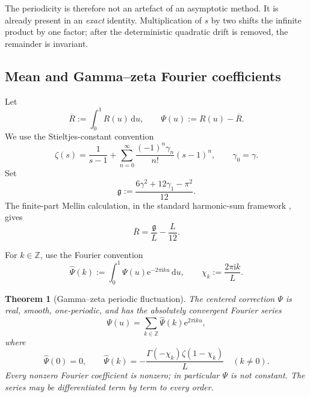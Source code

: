 \documentclass[11pt]{article}
\numberwithin{equation}{section}
\newtheorem{theorem}{Theorem}[section]
\theoremstyle{definition}
\theoremstyle{remark}
\newcommand{\Z}{\mathbb Z}
\newcommand{\dd}{\,\mathrm d}
\newcommand{\e}{\mathrm e}
\newcommand{\ii}{\mathrm i}
\begin{document}
The periodicity is therefore not an artefact of an asymptotic method.  It is
already present in an \emph{exact} identity.  Multiplication of $s$ by two
shifts the infinite product by one factor; after the deterministic quadratic
drift is removed, the remainder is invariant.

\subsection{Mean and Gamma--zeta Fourier coefficients}

Let
\begin{equation}\label{eq:R-mean-Psi}
 \overline R:=\int_0^1R(u)\dd u,
 \qquad \Psi(u):=R(u)-\overline R.
\end{equation}
We use the Stieltjes-constant convention
\begin{equation}\label{eq:Stieltjes-convention}
 \zeta(s)=\frac1{s-1}
 +\sum_{n=0}^{\infty}\frac{(-1)^n\gamma_n}{n!}(s-1)^n,
 \qquad \gamma_0=\gamma.
\end{equation}
Set
\begin{equation}\label{eq:gmathfrak}
 \mathfrak g:=\frac{6\gamma^2+12\gamma_1-\pi^2}{12}.
\end{equation}
The finite-part Mellin calculation, in the standard harmonic-sum framework \cite{FlajoletMellin}, gives
\begin{equation}\label{eq:R-mean}
 \overline R=\frac{\mathfrak g}{L}-\frac L{12}.
\end{equation}

For $k\in\Z$, use the Fourier convention
\begin{equation}\label{eq:Psi-Fourier-convention}
 \widehat\Psi(k):=\int_0^1\Psi(u)\e^{-2\pi\ii ku}\dd u,
 \qquad
 \chi_k:=\frac{2\pi\ii k}{L}.
\end{equation}

\begin{theorem}[Gamma--zeta periodic fluctuation]\label{thm:Psi-Fourier}
The centered correction $\Psi$ is real, smooth, one-periodic, and has the
absolutely convergent Fourier series
\begin{equation}\label{eq:Psi-Fourier-series}
 \Psi(u)=\sum_{k\in\Z}\widehat\Psi(k)\e^{2\pi\ii ku},
\end{equation}
where
\begin{equation}\label{eq:Psi-Fourier-coeff}
 \widehat\Psi(0)=0,
 \qquad
 \boxed{
 \widehat\Psi(k)=-\frac{\Gamma(-\chi_k)\zeta(1-\chi_k)}{L}}
 \quad(k\ne0).
\end{equation}
Every nonzero Fourier coefficient is nonzero; in particular $\Psi$ is not
constant.  The series may be differentiated term by term to every order.
\end{theorem}
\end{document}
